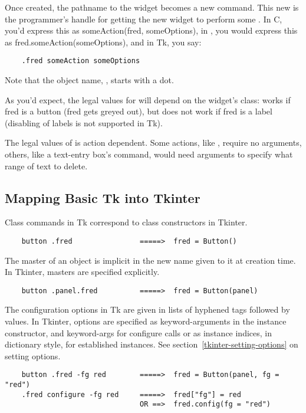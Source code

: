 Once created, the pathname to the widget becomes a new command.  This
new  is the programmer's handle for getting the new
widget to perform some .  In C, you'd express this as
someAction(fred, someOptions), in \Cpp, you would express this as
fred.someAction(someOptions), and in Tk, you say: 

\begin{verbatim}
    .fred someAction someOptions 
\end{verbatim} 

Note that the object name, , starts with a dot.

As you'd expect, the legal values for  will depend on
the widget's class:  works if fred is a
button (fred gets greyed out), but does not work if fred is a label
(disabling of labels is not supported in Tk). 

The legal values of  is action dependent.  Some
actions, like , require no arguments, others, like
a text-entry box's  command, would need arguments
to specify what range of text to delete.  


\subsection{Mapping Basic Tk into Tkinter
            \label{tkinter-basic-mapping}}

Class commands in Tk correspond to class constructors in Tkinter.

\begin{verbatim}
    button .fred                =====>  fred = Button()
\end{verbatim}

The master of an object is implicit in the new name given to it at
creation time.  In Tkinter, masters are specified explicitly.

\begin{verbatim}
    button .panel.fred          =====>  fred = Button(panel)
\end{verbatim}

The configuration options in Tk are given in lists of hyphened tags
followed by values.  In Tkinter, options are specified as
keyword-arguments in the instance constructor, and keyword-args for
configure calls or as instance indices, in dictionary style, for
established instances.  See section~\ref{tkinter-setting-options} on
setting options.

\begin{verbatim}
    button .fred -fg red        =====>  fred = Button(panel, fg = "red")
    .fred configure -fg red     =====>  fred["fg"] = red
                                OR ==>  fred.config(fg = "red")
\end{verbatim}

